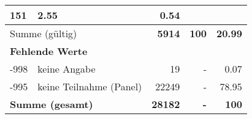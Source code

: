 \begin{longtable}{lXrrr}
       \num{151} &
       \num[round-mode=places,round-precision=2]{2.55} &
         \num[round-mode=places,round-precision=2]{0.54} \\
     \midrule
     \multicolumn{2}{l}{Summe (gültig)} &
       \textbf{\num{5914}} &
     \textbf{\num{100}} &
       \textbf{\num[round-mode=places,round-precision=2]{20.99}} \\
     \multicolumn{5}{l}{\textbf{Fehlende Werte}}\\
       -998 &
       keine Angabe &
         \num{19} &
        - &
         \num[round-mode=places,round-precision=2]{0.07} \\
       -995 &
       keine Teilnahme (Panel) &
         \num{22249} &
        - &
         \num[round-mode=places,round-precision=2]{78.95} \\
     \midrule
     \multicolumn{2}{l}{\textbf{Summe (gesamt)}} &
          \textbf{\num{28182}} &
        \textbf{-} &
        \textbf{\num{100}} \\
     \bottomrule
     \end{longtable}
     
